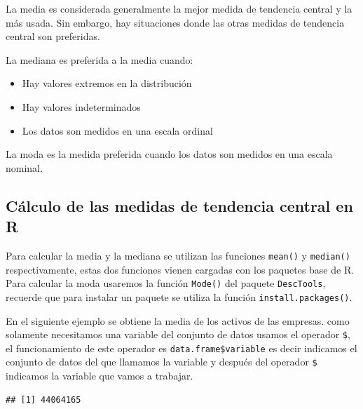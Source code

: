 \documentclass[]{book}
\newenvironment{Shaded}{\begin{snugshade}}{\end{snugshade}}
\newcommand{\KeywordTok}[1]{\textcolor[rgb]{0.13,0.29,0.53}{\textbf{#1}}}
\newcommand{\OperatorTok}[1]{\textcolor[rgb]{0.81,0.36,0.00}{\textbf{#1}}}
\newcommand{\NormalTok}[1]{#1}
\providecommand{\tightlist}{%
  \setlength{\itemsep}{0pt}\setlength{\parskip}{0pt}}
\begin{document}
La media es considerada generalmente la mejor medida de tendencia
central y la más usada. Sin embargo, hay situaciones donde las otras
medidas de tendencia central son preferidas.

La mediana es preferida a la media cuando:

\begin{itemize}
\tightlist
\item
  Hay valores extremos en la distribución
\item
  Hay valores indeterminados
\item
  Los datos son medidos en una escala ordinal
\end{itemize}

La moda es la medida preferida cuando los datos son medidos en una
escala nominal.

\subsection{Cálculo de las medidas de tendencia central en
R}\label{calculo-de-las-medidas-de-tendencia-central-en-r}

Para calcular la media y la mediana se utilizan las funciones
\texttt{mean()} y \texttt{median()} respectivamente, estas dos funciones
vienen cargadas con los paquetes base de R. Para calcular la moda
usaremos la función \texttt{Mode()} del paquete \texttt{DescTools},
recuerde que para instalar un paquete se utiliza la función
\texttt{install.packages()}.

En el siguiente ejemplo se obtiene la media de los activos de las
empresas. como solamente necesitamos una variable del conjunto de datos
usamos el operador \texttt{\$}, el funcionamiento de este operador es
\texttt{data.frame\$variable} es decir indicamos el conjunto de datos
del que llamamos la variable y después del operador \texttt{\$}
indicamos la variable que vamos a trabajar.

\begin{Shaded}
\end{Shaded}

\begin{verbatim}
## [1] 44064165
\end{verbatim}

\begin{Shaded}
\end{Shaded}
\end{document}
